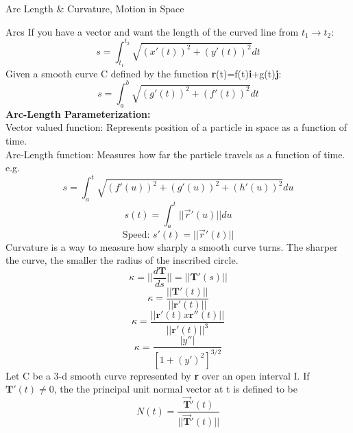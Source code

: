 \documentclass[a4paper, 12pt]{article}
\begin{document}
\begin{section}{Arc Length \& Curvature, Motion in Space}
\begin{subsection}{Arcs}
If you have a vector and want the length of the curved line from $t_1 \to t_2$:
\begin{equation} \label{}
s= \int_{t_1}^{t_2}\sqrt{(x'(t))^{2}+(y'(t))^{2}}dt
\end{equation}
Given a smooth curve C defined by the function \textbf{r}(t)=f(t)\textbf{i}+g(t)\textbf{j}:\\
\begin{equation} \label{}
s= \int_{a}^{b}\sqrt{(g'(t))^{2}+(f'(t))^{2}}dt
\end{equation}
\textbf{Arc-Length Parameterization:}\\
Vector valued function: Represents position of a particle in space as a function of time.\\
Arc-Length function: Measures how far the particle travels as a function of time. e.g.
\begin{equation} 
	s=\int_{a}^{t}\sqrt{(f'(u))^{2}+(g'(u))^{2}+(h'(u))^{2}}du
\end{equation}
\begin{equation} 
	s(t)=\int_{a}^{t}||\vec{r}'(u)||du
\end{equation}
\begin{equation} 
	\mbox{Speed: }s'(t)=||\vec{r}'(t)||
\end{equation}
Curvature is a way to measure how sharply a smooth curve turns. The sharper the curve, the
smaller the radius of the inscribed circle.\\
\begin{equation} 
	\kappa = ||\frac{d\textbf{T}}{ds}||=||\textbf{T}'(s)||
\end{equation}
\begin{equation}
	\kappa = \frac{||\textbf{T}'(t)||}{||\textbf{r}'(t)||}
\end{equation}
\begin{equation}
	\kappa =\frac{||\textbf{r}'(t)x\textbf{r}''(t)||}{||\textbf{r}'(t)||^{3}}
\end{equation}
\begin{equation} 
	\kappa=\frac{|y''|}{\left[1+(y')^{2}\right]^{3/2}}
\end{equation}
Let C be a 3-d smooth curve represented by \textbf{r} over an open interval I. If
$\textbf{T}'(t) \neq 0$, the the principal unit normal vector at t is defined to be
\begin{equation} 
	N(t)=\frac{\vec{\textbf{T}}'(t)}{||\vec{\textbf{T}}'(t)||}

\end{equation}
\end{subsection}
\end{section}
\end{document}

